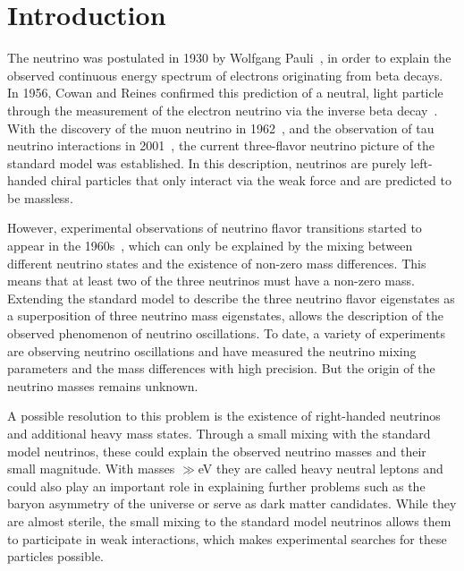 \setchapterpreamble[u]{\margintoc}

\chapter{Introduction}

The neutrino was postulated in 1930 by Wolfgang Pauli~, in order to explain the observed continuous energy spectrum of electrons originating from beta decays. In 1956, Cowan and Reines confirmed this prediction of a neutral, light particle through the measurement of the electron neutrino via the inverse beta decay~. With the discovery of the muon neutrino in 1962~, and the observation of tau neutrino interactions in 2001~, the current three-flavor neutrino picture of the standard model was established. In this description, neutrinos are purely left-handed chiral particles that only interact via the weak force and are predicted to be massless.

However, experimental observations of neutrino flavor transitions started to appear in the 1960s~, which can only be explained by the mixing between different neutrino states and the existence of non-zero mass differences. This means that at least two of the three neutrinos must have a non-zero mass. Extending the standard model to describe the three neutrino flavor eigenstates as a superposition of three neutrino mass eigenstates, allows the description of the observed phenomenon of neutrino oscillations. To date, a variety of experiments are observing neutrino oscillations and have measured the neutrino mixing parameters and the mass differences with high precision. But the origin of the neutrino masses remains unknown.

A possible resolution to this problem is the existence of right-handed neutrinos and additional heavy mass states. Through a small mixing with the standard model neutrinos, these could explain the observed neutrino masses and their small magnitude. With masses $\gg$\si{\electronvolt} they are called heavy neutral leptons and could also play an important role in explaining further problems such as the baryon asymmetry of the universe or serve as dark matter candidates. While they are almost sterile, the small mixing to the standard model neutrinos allows them to participate in weak interactions, which makes experimental searches for these particles possible.


